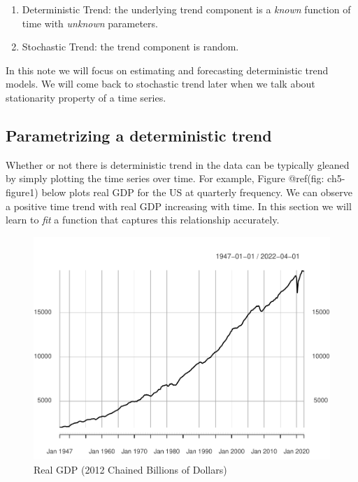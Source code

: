 \documentclass[]{book}
\theoremstyle{definition}
\theoremstyle{definition}
\theoremstyle{definition}
\theoremstyle{remark}
\begin{document}
\begin{enumerate}
\def\labelenumi{\arabic{enumi}.}
\item
  Deterministic Trend: the underlying trend component is a \emph{known} function of time with \emph{unknown} parameters.
\item
  Stochastic Trend: the trend component is random.
\end{enumerate}

In this note we will focus on estimating and forecasting deterministic trend models. We will come back to stochastic trend later when we talk about stationarity property of a time series.

\hypertarget{parametrizing-a-deterministic-trend}{%
\subsection{Parametrizing a deterministic trend}\label{parametrizing-a-deterministic-trend}}

Whether or not there is deterministic trend in the data can be typically gleaned by simply plotting the time series over time. For example, Figure @ref(fig: ch5-figure1) below plots real GDP for the US at quarterly frequency. We can observe a positive time trend with real GDP increasing with time. In this section we will learn to \emph{fit} a function that captures this relationship accurately.

\begin{figure}

{\centering \includegraphics[width=0.8\linewidth]{bookdown-demo_files/figure-latex/ch5-figure1-1} 

}

\caption{Real GDP (2012 Chained Billions of Dollars)}\label{fig:ch5-figure1}
\end{figure}
\end{document}
